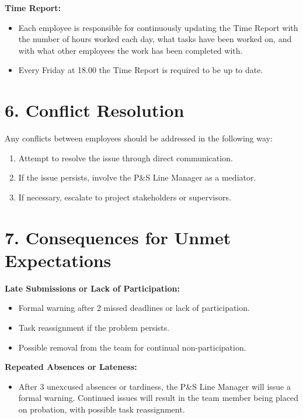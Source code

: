\documentclass[a4paper,12pt]{article}
\begin{document}
\noindent\textbf{Time Report:} 
\begin{itemize}[leftmargin=2em]
    \item Each employee is responsible for continuously updating the Time Report with the number of hours worked each day, what tasks have been worked on, and with what other employees the work has been completed with. 
    \item Every Friday at 18.00 the Time Report is required to be up to date.
\end{itemize}

\vspace{1em}

\section*{6. Conflict Resolution}
\vspace{0.5em} 

Any conflicts between employees should be addressed in the following way:
\begin{enumerate}[label=\arabic*.]
    \item Attempt to resolve the issue through direct communication.
    \item If the issue persists, involve the P\&S Line Manager as a mediator.
    \item If necessary, escalate to project stakeholders or supervisors.
\end{enumerate}

\vspace{1em}

\section*{7. Consequences for Unmet Expectations}
\vspace{0.5em} 

\textbf{Late Submissions or Lack of Participation:}
\begin{itemize}[leftmargin=2em]
    \item Formal warning after 2 missed deadlines or lack of participation.
    \item Task reassignment if the problem persists.
    \item Possible removal from the team for continual non-participation.
\end{itemize}

\vspace{0.5em} 

\noindent\textbf{Repeated Absences or Lateness:}
\begin{itemize}[leftmargin=2em]
    \item After 3 unexcused absences or tardiness, the P\&S Line Manager will issue a formal warning. Continued issues will result in the team member being placed on probation, with possible task reassignment.
\end{itemize}
\end{document}
